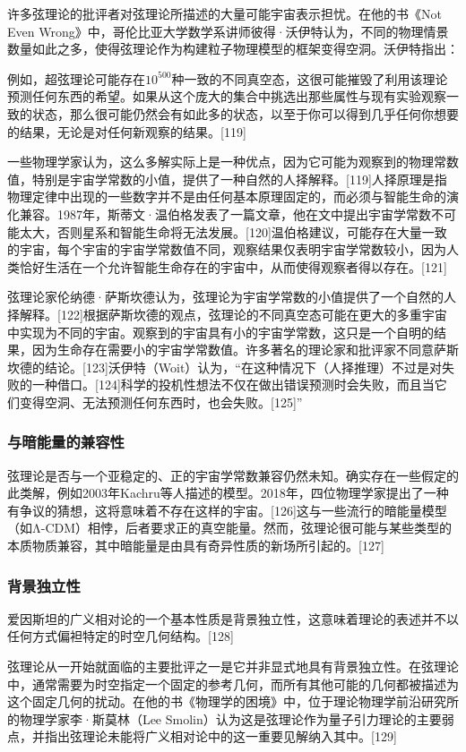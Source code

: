 许多弦理论的批评者对弦理论所描述的大量可能宇宙表示担忧。在他的书《Not Even Wrong》中，哥伦比亚大学数学系讲师彼得·沃伊特认为，不同的物理情景数量如此之多，使得弦理论作为构建粒子物理模型的框架变得空洞。沃伊特指出：

例如，超弦理论可能存在\(10^{500}\)种一致的不同真空态，这很可能摧毁了利用该理论预测任何东西的希望。如果从这个庞大的集合中挑选出那些属性与现有实验观察一致的状态，那么很可能仍然会有如此多的状态，以至于你可以得到几乎任何你想要的结果，无论是对任何新观察的结果。[119]

一些物理学家认为，这么多解实际上是一种优点，因为它可能为观察到的物理常数值，特别是宇宙学常数的小值，提供了一种自然的人择解释。[119]人择原理是指物理定律中出现的一些数字并不是由任何基本原理固定的，而必须与智能生命的演化兼容。1987年，斯蒂文·温伯格发表了一篇文章，他在文中提出宇宙学常数不可能太大，否则星系和智能生命将无法发展。[120]温伯格建议，可能存在大量一致的宇宙，每个宇宙的宇宙学常数值不同，观察结果仅表明宇宙学常数较小，因为人类恰好生活在一个允许智能生命存在的宇宙中，从而使得观察者得以存在。[121]

弦理论家伦纳德·萨斯坎德认为，弦理论为宇宙学常数的小值提供了一个自然的人择解释。[122]根据萨斯坎德的观点，弦理论的不同真空态可能在更大的多重宇宙中实现为不同的宇宙。观察到的宇宙具有小的宇宙学常数，这只是一个自明的结果，因为生命存在需要小的宇宙学常数值。许多著名的理论家和批评家不同意萨斯坎德的结论。[123]沃伊特（Woit）认为，“在这种情况下（人择推理）不过是对失败的一种借口。[124]科学的投机性想法不仅在做出错误预测时会失败，而且当它们变得空洞、无法预测任何东西时，也会失败。[125]”
\subsubsection{与暗能量的兼容性}
弦理论是否与一个亚稳定的、正的宇宙学常数兼容仍然未知。确实存在一些假定的此类解，例如2003年Kachru等人描述的模型。2018年，四位物理学家提出了一种有争议的猜想，这将意味着不存在这样的宇宙。[126]这与一些流行的暗能量模型（如Λ-CDM）相悖，后者要求正的真空能量。然而，弦理论很可能与某些类型的本质物质兼容，其中暗能量是由具有奇异性质的新场所引起的。[127]
\subsubsection{背景独立性}  
爱因斯坦的广义相对论的一个基本性质是背景独立性，这意味着理论的表述并不以任何方式偏袒特定的时空几何结构。[128]

弦理论从一开始就面临的主要批评之一是它并非显式地具有背景独立性。在弦理论中，通常需要为时空指定一个固定的参考几何，而所有其他可能的几何都被描述为这个固定几何的扰动。在他的书《物理学的困境》中，位于理论物理学前沿研究所的物理学家李·斯莫林（Lee Smolin）认为这是弦理论作为量子引力理论的主要弱点，并指出弦理论未能将广义相对论中的这一重要见解纳入其中。[129]

